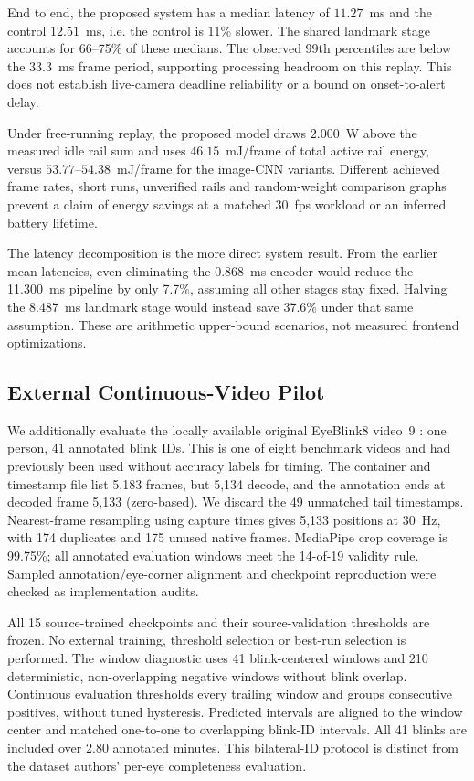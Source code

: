 \documentclass{IEEEmce}
\begin{document}
End to end, the proposed system has a median latency of $11.27$~ms and the control
$12.51$~ms, i.e. the control is 11\% slower. The shared landmark stage accounts for
66--75\% of these medians. The observed 99th percentiles are below the $33.3$~ms frame period, supporting
processing headroom on this replay. This does not establish live-camera deadline
reliability or a bound on onset-to-alert delay.

Under free-running replay, the proposed model draws $2.000$~W above the measured idle
rail sum and uses $46.15$~mJ/frame of total active rail energy, versus
$53.77$--$54.38$~mJ/frame for the image-CNN variants. Different achieved frame rates,
short runs, unverified rails and random-weight comparison graphs prevent a claim of
energy savings at a matched 30~fps workload or an inferred battery lifetime.

The latency decomposition is the more direct system result. From the earlier mean
latencies, even eliminating the 0.868~ms encoder would reduce the 11.300~ms pipeline
by only 7.7\%, assuming all other stages stay fixed. Halving the 8.487~ms landmark stage
would instead save 37.6\% under that same assumption. These are arithmetic upper-bound
scenarios, not measured frontend optimizations.


\subsection{External Continuous-Video Pilot}
We additionally evaluate the locally available original EyeBlink8 video~9
\cite{fogelton2016,eyeblink8data}: one person, 41 annotated blink IDs. This is one of
eight benchmark videos and had previously been used without accuracy labels for timing.
The container and timestamp file list 5,183 frames, but 5,134 decode, and the annotation
ends at decoded frame 5,133 (zero-based). We discard the 49 unmatched tail timestamps.
Nearest-frame resampling using capture times gives 5,133 positions at 30~Hz, with 174
duplicates and 175 unused native frames. MediaPipe crop coverage is 99.75\%; all
annotated evaluation windows meet the 14-of-19 validity rule. Sampled annotation/eye-corner
alignment and checkpoint reproduction were checked as implementation audits.

All 15 source-trained checkpoints and their source-validation thresholds are frozen.
No external training, threshold selection or best-run selection is performed. The
window diagnostic uses 41 blink-centered windows and 210 deterministic, non-overlapping
negative windows without blink overlap. Continuous evaluation thresholds every trailing
window and groups consecutive positives, without tuned hysteresis. Predicted intervals
are aligned to the window center and matched one-to-one to overlapping blink-ID
intervals. All 41 blinks are included over 2.80 annotated minutes. This bilateral-ID
protocol is distinct from the dataset authors' per-eye completeness evaluation.
\end{document}
